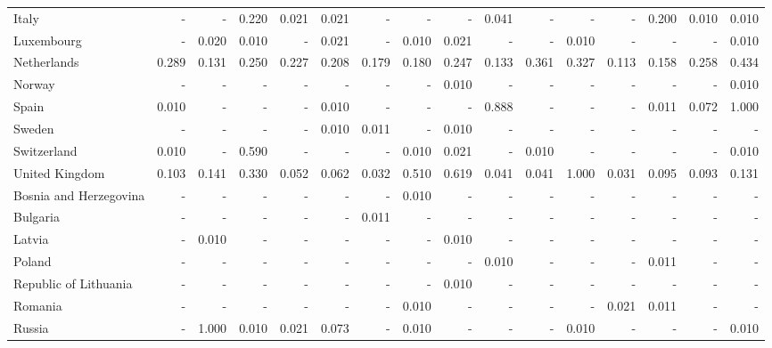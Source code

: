 \documentclass[10pt,twocolumn]{sig-alternate}
\begin{document}
\begin{table*}[t]
\begin{adjustbox}{width=1\textwidth}
\begin{tabular}{@{}ld{3.2}d{3.2}d{3.2}d{3.2}d{3.2}d{3.2}d{3.2}d{3.2}d{3.2}d{3.2}d{3.2}d{3.2}d{3.2}d{3.2}d{3.2}@{}}
Italy  & -  & -  & 0.220 & 0.021 & 0.021 & -  & -  & -  & 0.041 & -  & -  & -  & 0.200 & 0.010 & 0.010\\
Luxembourg  & -  & 0.020 & 0.010 & -  & 0.021 & -  & 0.010 & 0.021 & -  & -  & 0.010 & -  & -  & -  & 0.010\\
Netherlands  & 0.289 & 0.131 & 0.250 & 0.227 & 0.208 & 0.179 & 0.180 & 0.247 & 0.133 & 0.361 & 0.327 & 0.113 & 0.158 & 0.258 & 0.434\\
Norway  & -  & -  & -  & -  & -  & -  & -  & 0.010 & -  & -  & -  & -  & -  & -  & 0.010\\
Spain  & 0.010 & -  & -  & -  & 0.010 & -  & -  & -  & 0.888 & -  & -  & -  & 0.011 & 0.072 & 1.000\\
Sweden  & -  & -  & -  & -  & 0.010 & 0.011 & -  & 0.010 & -  & -  & -  & -  & -  & -  & - \\
Switzerland  & 0.010 & -  & 0.590 & -  & -  & -  & 0.010 & 0.021 & -  & 0.010 & -  & -  & -  & -  & 0.010\\
United Kingdom  & 0.103 & 0.141 & 0.330 & 0.052 & 0.062 & 0.032 & 0.510 & 0.619 & 0.041 & 0.041 & 1.000 & 0.031 & 0.095 & 0.093 & 0.131\\ \hline
Bosnia and Herzegovina  & -  & -  & -  & -  & -  & -  & 0.010 & -  & -  & -  & -  & -  & -  & -  & - \\
Bulgaria  & -  & -  & -  & -  & -  & 0.011 & -  & -  & -  & -  & -  & -  & -  & -  & - \\
Latvia  & -  & 0.010 & -  & -  & -  & -  & -  & 0.010 & -  & -  & -  & -  & -  & -  & - \\
Poland  & -  & -  & -  & -  & -  & -  & -  & -  & 0.010 & -  & -  & -  & 0.011 & -  & - \\
Republic of Lithuania  & -  & -  & -  & -  & -  & -  & -  & 0.010 & -  & -  & -  & -  & -  & -  & - \\
Romania  & -  & -  & -  & -  & -  & -  & 0.010 & -  & -  & -  & -  & 0.021 & 0.011 & -  & - \\
Russia  & -  & 1.000 & 0.010 & 0.021 & 0.073 & -  & 0.010 & -  & -  & -  & 0.010 & -  & -  & -  & 0.010\\

\end{tabular}
\end{adjustbox}
\end{table*}
\end{document}
